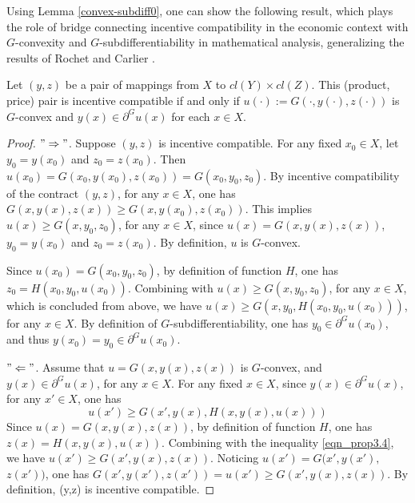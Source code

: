 				
Using Lemma \ref{convex-subdiff0}, one can show the following result,  %
which plays the role of bridge connecting incentive compatibility in the economic context with $G$-convexity and $G$-subdifferentiability in mathematical analysis, generalizing the results of Rochet \cite{Rochet87} and Carlier \cite{Carlier01}.
\medskip




\begin{proposition}\label{incen/convex}
	Let $(y,z)$ be a pair of mappings from $X$ to $cl(Y) \times cl(Z)$.  This (product, price) pair is incentive compatible 
	if and only if $u(\cdot):=G(\cdot,y(\cdot),z(\cdot))$ is $G$-convex and $y(x)\in \partial^G u(x)$ for each $x \in X$.
\end{proposition}
					
\begin{proof}%
	$"\Rightarrow"$. Suppose $(y,z)$ is incentive compatible. For any fixed $x_0 \in X$, let $y_0 = y(x_0)$ and $z_0 = z(x_0)$. Then $u(x_0) = G(x_0, y(x_0), z(x_0)) = G(x_0, y_0, z_0)$. By incentive compatibility of the contract $(y,z)$, for any $x\in X$, one has $G(x, y(x), z(x)) \ge G(x, y(x_0), z(x_0))$. This implies $u(x) \ge G(x,y_0,z_0)$, for any $x\in X$, since $u(x)= G(x, y(x), z(x))$,  $y_0 = y(x_0)$ and $z_0 = z(x_0)$. By definition, $u$ is $G$-convex. 
	
	Since $u(x_0)=G(x_0, y_0, z_0)$, by definition of function $H$, one has $z_0 = H(x_0, y_0, u(x_0))$.  Combining with $u(x) \ge G(x, y_0, z_0)$,  for any $x\in X$, which is concluded from above, we have $u(x)\ge G(x, y_0, H(x_0, y_0, u(x_0)))$, for any $x\in X$. By definition of  $G$-subdifferentiability, one has $y_0 \in \partial^G u(x_0)$, and thus $y(x_0) = y_0 \in \partial^G u(x_0)$.
	
	$"\Leftarrow"$. Assume that $u = G(x, y(x),z(x))$ is $G$-convex, and $y(x)\in \partial^G u(x)$, for any $x\in X$. For any fixed $x \in X$, since $y(x)\in \partial^G u(x)$, for any $x'\in X$, one has 
	\begin{equation}\label{eqn_prop3.4}
	u(x')\ge G(x', y(x), H(x, y(x), u(x)))
	\end{equation} 
	Since $u(x) = G(x, y(x),z(x))$, by definition of function $H$, one has $z(x) = H(x,y(x), u(x))$. Combining with the inequality \eqref{eqn_prop3.4}, we have $u(x')\ge G(x', y(x), z(x))$. Noticing $u(x') = G(x',y(x'),$ $z(x')) $, one has $G(x',y(x'),z(x')) = u(x') \ge G(x', y(x), z(x))$.
	By definition, (y,z) is incentive compatible.
\end{proof}












